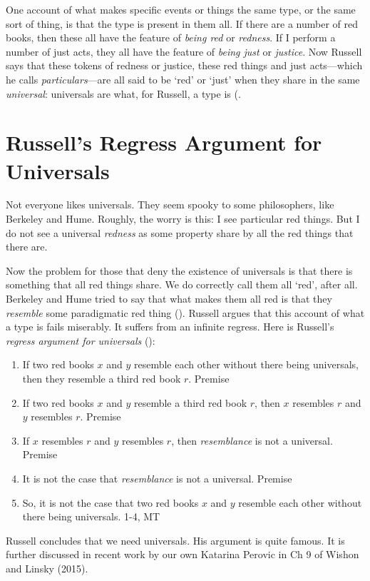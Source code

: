 \documentclass[oneside,letterpaper,12pt]{book}
\begin{document}
One account of what makes specific events or things the same type, or the same sort of thing, is that the type is present in them all. If there are a number of red books, then these all have the feature of \textit{being red} or \textit{redness}. If I perform a number of just acts, they all have the feature of \textit{being just} or \textit{justice}. Now Russell says that these tokens of redness or justice, these red things and just acts---which he calls \textit{particulars}---are all said to be `red' or `just' when they share in the same \textit{universal}: universals are what, for Russell, a type is (\pageref{types}. 
\section*{Russell's Regress Argument for Universals}
Not everyone likes universals. They seem spooky to some philosophers, like Berkeley and Hume. Roughly, the worry is this: I see particular red things. But I do not see a universal \textit{redness} as some property share by all the red things that there are. 

Now the problem for those that deny the existence of universals is that there is something that all red things share. We do correctly call them all `red', after all. Berkeley and Hume tried to say that what makes them all red is that they \textit{resemble} some paradigmatic red thing (\pageref{resemblances}). Russell argues that this account of what a type is fails miserably. It suffers from an infinite regress. Here is Russell's \textit{regress argument for universals} (\pageref{regress}):
\begin{enumerate}%
	\item If two red books $x$ and $y$ resemble each other without there being universals, then they resemble a third red book $r$. \hfill Premise
	\item If two red books $x$ and $y$ resemble a third red book $r$, then $x$ resembles $r$ and $y$ resembles $r$. \hfill Premise
	\item If $x$ resembles $r$ and $y$ resembles $r$, then \textit{resemblance} is not a universal. \hfill Premise
	\item It is not the case that \textit{resemblance} is not a universal. \hfill Premise
	\item So, it is not the case that two red books $x$ and $y$ resemble each other without there being universals. \hfill 1-4, MT
\end{enumerate}
Russell concludes that we need universals. His argument is quite famous. It is further discussed in recent work by our own Katarina Perovic in Ch 9 of Wishon and Linsky (2015).
\end{document}
